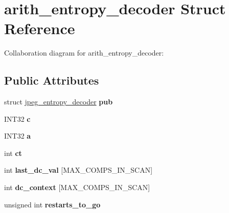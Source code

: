 \hypertarget{structarith__entropy__decoder}{\section{arith\+\_\+entropy\+\_\+decoder Struct Reference}
\label{structarith__entropy__decoder}
}


Collaboration diagram for arith\+\_\+entropy\+\_\+decoder\+:
\subsection*{Public Attributes}
\begin{DoxyCompactItemize}
\item 
\hypertarget{structarith__entropy__decoder_a26f1da810c05744076bad3072983d0d1}{struct \hyperlink{structjpeg__entropy__decoder}{jpeg\+\_\+entropy\+\_\+decoder} {\bfseries pub}}\label{structarith__entropy__decoder_a26f1da810c05744076bad3072983d0d1}

\item 
\hypertarget{structarith__entropy__decoder_abad1e8f477d4015c7069855679885618}{I\+N\+T32 {\bfseries c}}\label{structarith__entropy__decoder_abad1e8f477d4015c7069855679885618}

\item 
\hypertarget{structarith__entropy__decoder_afb33bbe1e85d3d76b8b119a46db68a77}{I\+N\+T32 {\bfseries a}}\label{structarith__entropy__decoder_afb33bbe1e85d3d76b8b119a46db68a77}

\item 
\hypertarget{structarith__entropy__decoder_a6c907da02b3db27a4b0f025733a44109}{int {\bfseries ct}}\label{structarith__entropy__decoder_a6c907da02b3db27a4b0f025733a44109}

\item 
\hypertarget{structarith__entropy__decoder_afd8cad23cfc049f4ae748308f239bb20}{int {\bfseries last\+\_\+dc\+\_\+val} \mbox{[}M\+A\+X\+\_\+\+C\+O\+M\+P\+S\+\_\+\+I\+N\+\_\+\+S\+C\+A\+N\mbox{]}}\label{structarith__entropy__decoder_afd8cad23cfc049f4ae748308f239bb20}

\item 
\hypertarget{structarith__entropy__decoder_a0b9a2123aec7d879cff09e315530d5e8}{int {\bfseries dc\+\_\+context} \mbox{[}M\+A\+X\+\_\+\+C\+O\+M\+P\+S\+\_\+\+I\+N\+\_\+\+S\+C\+A\+N\mbox{]}}\label{structarith__entropy__decoder_a0b9a2123aec7d879cff09e315530d5e8}

\item 
\hypertarget{structarith__entropy__decoder_ab587034265fc6747822cfb11167e4004}{unsigned int {\bfseries restarts\+\_\+to\+\_\+go}}\label{structarith__entropy__decoder_ab587034265fc6747822cfb11167e4004}


\end{DoxyCompactItemize}
